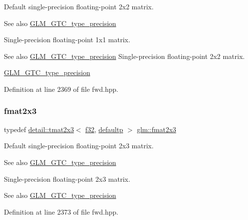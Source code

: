 Default single-\/precision floating-\/point 2x2 matrix. \begin{DoxySeeAlso}{See also}
\hyperlink{group__gtc__type__precision}{G\+L\+M\+\_\+\+G\+T\+C\+\_\+type\+\_\+precision}
\end{DoxySeeAlso}
Single-\/precision floating-\/point 1x1 matrix. \begin{DoxySeeAlso}{See also}
\hyperlink{group__gtc__type__precision}{G\+L\+M\+\_\+\+G\+T\+C\+\_\+type\+\_\+precision} Single-\/precision floating-\/point 2x2 matrix. 

\hyperlink{group__gtc__type__precision}{G\+L\+M\+\_\+\+G\+T\+C\+\_\+type\+\_\+precision} 
\end{DoxySeeAlso}


Definition at line 2369 of file fwd.\+hpp.

\mbox{\label{group__gtc__type__precision_ga087d875cd4e384f101a28a4caf8ccd94}} 
\subsubsection{\texorpdfstring{fmat2x3}{fmat2x3}}
{\footnotesize\ttfamily typedef \hyperlink{structglm_1_1detail_1_1tmat2x3}{detail\+::tmat2x3}$<$ \hyperlink{group__gtc__type__precision_ga0ec999b57f5330d9021256e96038df04}{f32}, \hyperlink{namespaceglm_a0f04f086094c747d227af4425893f545a9d21ccd8b5a009ec7eb7677befc3bf51}{defaultp} $>$ \hyperlink{group__gtc__type__precision_ga087d875cd4e384f101a28a4caf8ccd94}{glm\+::fmat2x3}}

Default single-\/precision floating-\/point 2x3 matrix. \begin{DoxySeeAlso}{See also}
\hyperlink{group__gtc__type__precision}{G\+L\+M\+\_\+\+G\+T\+C\+\_\+type\+\_\+precision}
\end{DoxySeeAlso}
Single-\/precision floating-\/point 2x3 matrix. \begin{DoxySeeAlso}{See also}
\hyperlink{group__gtc__type__precision}{G\+L\+M\+\_\+\+G\+T\+C\+\_\+type\+\_\+precision} 
\end{DoxySeeAlso}


Definition at line 2373 of file fwd.\+hpp.

\mbox{\label{group__gtc__type__precision_gaf3af7a2f10aaf8028a95b7232b24d84e}} 
